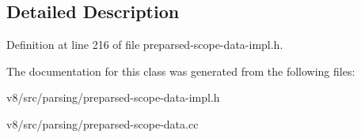 \subsection{Detailed Description}


Definition at line 216 of file preparsed-\/scope-\/data-\/impl.\+h.



The documentation for this class was generated from the following files\+:\begin{DoxyCompactItemize}
\item 
v8/src/parsing/preparsed-\/scope-\/data-\/impl.\+h\item 
v8/src/parsing/preparsed-\/scope-\/data.\+cc\end{DoxyCompactItemize}
